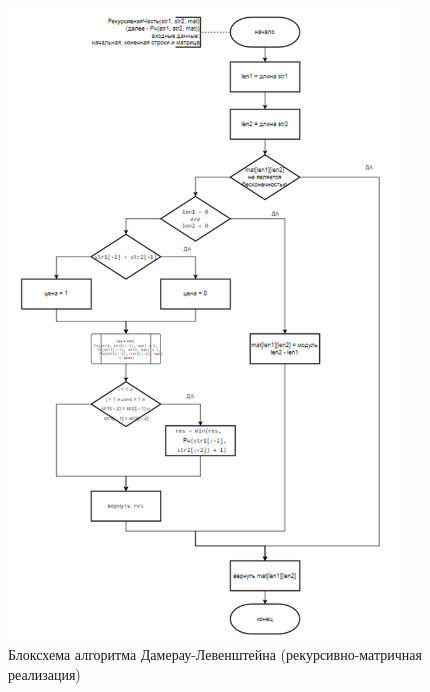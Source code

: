 \begin{figure}[H]
    \centering
    \includegraphics[width=0.93\textwidth]{img/block_2_3_1.png}
    \caption{Блоксхема алгоритма Дамерау-Левенштейна (рекурсивно-матричная реализация)}
\end{figure}

